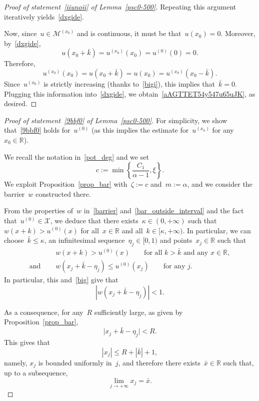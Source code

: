 \documentclass[10pt,a4paper]{amsart}
\numberwithin{equation}{section}
\newcommand{\R}{\mathbb{R}}
\begin{document}
\begin{proof}[Proof of statement~\eqref{iiunoii} of Lemma~\eqref{psc0-500}]
Repeating this argument iteratively yields~\eqref{dxgide}.

Now, since~$u \in \mathscr{M}^{(x_0)}$ and is continuous, it must be that~$u(x_0)=0$. 
Moreover, by~\eqref{dxgide},
$$  u(x_0+\bar{k})= u^{(x_0)}(x_0)=u^{(0)}(0)=0. $$ 
Therefore,
$$ u^{(x_0)}(x_0)=u(x_0+\bar{k})=u(x_0)=u^{(x_0)}(x_0-\bar{k}).
$$
Since~$u^{(x_0)}$ is strictly increasing (thanks to~\eqref{bigi}),
this implies that~$\bar{k}=0$.
Plugging this information into~\eqref{dxgide},
we obtain~\eqref{aAGTTET54y547u65uJK}, as desired.
\end{proof}

\begin{proof}[Proof of statement~\eqref{9bbf0} of Lemma~\eqref{psc0-500}]
For simplicity, we show that~\eqref{9bbf0} holds for~$u^{(0)}$
(as this implies the estimate for~$u^{(x_0)}$ for any~$x_0\in\R$). 

We recall the notation in~\eqref{pot_deg} and we set
\begin{equation}\label{vttv4869302}
 c:= \min\left\{ \frac{C_1}{\alpha-1}, \xi \right\}.
\end{equation}
We exploit Proposition~\ref{prop_bar} with~$\zeta:=c$ and~$ m:= \alpha$, and we consider the barrier~$w$ constructed there.
 
{F}rom the properties of~$w$ in~\eqref{barrier} and~\eqref{bar_outside_interval} and the fact that~$u^{(0)} \in \mathcal{X}$, we deduce that there exists~$\kappa \in (0,+\infty)$ such that~$w(x+k) > u^{(0)}(x)$ for all~$x \in \R$ and all~$k \in [\kappa,+\infty)$. In particular, we can choose~$\bar{k}\leq \kappa$, an infinitesimal sequence~$\eta_j \in [0,1)$ and points~$x_j \in \R$ such that
    	\begin{align}
&w(x+k) >u^{(0)}(x) \qquad \mbox{for all } k> \bar{k} \mbox{ and any } x \in \R, \label{maj} \\
{\mbox{and }}\quad
&w(x_j+\bar{k}-\eta_j)\leq u^{(0)}(x_j) \qquad \mbox{for any } j. \label{min}
\end{align}
In particular, this and~\eqref{big} give that 
\[|w(x_j+\bar{k}-\eta_j)| <1. \]

As a consequence, for any~$R$ sufficiently large, as given by
Proposition~\ref{prop_bar},
\begin{equation}\label{fus}
 \big|x_j+\bar{k}-\eta_j\big| < R.
\end{equation} 
This gives that
\[|x_j| \leq R+ |\bar{k}|+1,\]
namely, $x_j$ is bounded uniformly in~$j$,
and therefore there exists~$\bar{x}\in\R$ such that, up to a subsequence,
\begin{equation}\label{lim}
\lim_{j \to +\infty} x_j = \bar{x}.
\end{equation} 
  

\end{proof}
\end{document}
